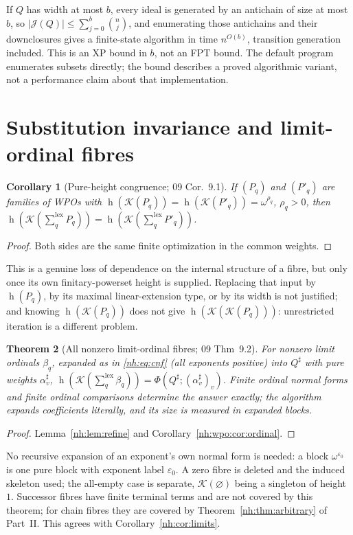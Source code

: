 \documentclass[11pt,a4paper]{article}
\newtheorem{theorem}{Theorem}[section]
\newtheorem{corollary}[theorem]{Corollary}
\theoremstyle{definition}
\theoremstyle{remark}
\newcommand{\K}{\mathcal K}
\newcommand{\hgt}{\operatorname{h}}
\newcommand{\J}{\mathcal J}
\newcommand{\lxsi}{\mathop{\textstyle\sum}\nolimits^{\mathrm{lex}}}
\begin{document}
If $Q$ has width at most $b$, every ideal is generated by an antichain of size at
most $b$, so $|\J(Q)|\le\sum_{j=0}^b\binom nj$, and enumerating those antichains
and their downclosures gives a finite-state algorithm in time $n^{O(b)}$,
transition generation included. This is an XP bound in $b$, not an FPT bound. The
default program enumerates subsets directly; the bound describes a proved
algorithmic variant, not a performance claim about that implementation.

\section{Substitution invariance and limit-ordinal fibres}\label{nh:wpo:sec:extension}

\begin{corollary}[Pure-height congruence; 09 Cor.~9.1]\label{nh:wpo:cor:congruence}
If $(P_q)$ and $(P'_q)$ are families of WPOs with
$\hgt(\K(P_q))=\hgt(\K(P'_q))=\omega^{\rho_q}$, $\rho_q>0$, then
$\hgt(\K(\lxsi_qP_q))=\hgt(\K(\lxsi_qP'_q))$.
\end{corollary}
\begin{proof}
Both sides are the same finite optimization in the common weights.
\end{proof}

This is a genuine loss of dependence on the internal structure of a fibre, but
only once its own finitary-powerset height is supplied. Replacing that input by
$\hgt(P_q)$, by its maximal linear-extension type, or by its width is not
justified; and knowing $\hgt(\K(P_q))$ does not give $\hgt(\K(\K(P_q)))$:
unrestricted iteration is a different problem.

\begin{theorem}[All nonzero limit-ordinal fibres; 09 Thm~9.2]\label{nh:wpo:thm:limits}
For nonzero limit ordinals $\beta_q$, expanded as in \eqref{nh:eq:cnf} (all
exponents positive) into $Q^\sharp$ with pure weights $\alpha^\sharp_v$,
$\hgt(\K(\lxsi_q\beta_q))=\Phi(Q^\sharp;(\alpha^\sharp_v)_v)$. Finite ordinal
normal forms and finite ordinal comparisons determine the answer exactly; the
algorithm expands coefficients literally, and its size is measured in expanded
blocks.
\end{theorem}
\begin{proof}
Lemma~\ref{nh:lem:refine} and Corollary~\ref{nh:wpo:cor:ordinal}.
\end{proof}

No recursive expansion of an exponent's own normal form is needed: a block
$\omega^{\varepsilon_0}$ is one pure block with exponent label $\varepsilon_0$. A
zero fibre is deleted and the induced skeleton used; the all-empty case is
separate, $\K(\varnothing)$ being a singleton of height $1$. Successor fibres
have finite terminal terms and are not covered by this theorem; for chain fibres
they are covered by Theorem~\ref{nh:thm:arbitrary} of Part~II. This agrees with
Corollary~\ref{nh:cor:limits}.
\end{document}
